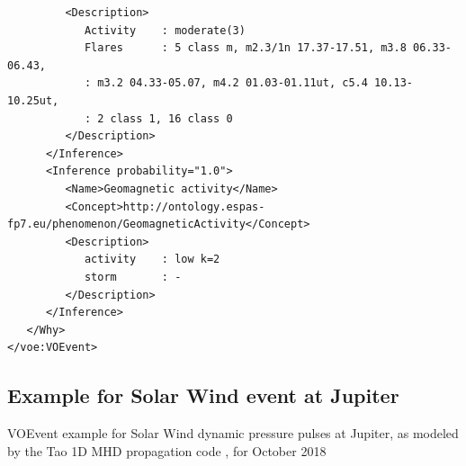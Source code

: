 \documentclass[referee,a4paper,12pt,traditabstract]{swsc}
\begin{document}
\begin{linenumbers}
{\begin{verbatim}
         <Description>
            Activity    : moderate(3)
            Flares      : 5 class m, m2.3/1n 17.37-17.51, m3.8 06.33-06.43,
            : m3.2 04.33-05.07, m4.2 01.03-01.11ut, c5.4 10.13-10.25ut,
            : 2 class 1, 16 class 0
         </Description>
      </Inference>
      <Inference probability="1.0">
         <Name>Geomagnetic activity</Name>
         <Concept>http://ontology.espas-fp7.eu/phenomenon/GeomagneticActivity</Concept>
         <Description>
            activity    : low k=2
            storm       : -
         </Description>
      </Inference>
   </Why>
</voe:VOEvent>
\end{verbatim}
}

\subsection{Example for Solar Wind event at Jupiter}
\label{appendix-xml-voevent-tao}
VOEvent example for Solar Wind dynamic pressure pulses at Jupiter, as modeled by the Tao 1D MHD propagation code \cite{Tao:2005dp}, for October 2018


\end{linenumbers}
\end{document}
